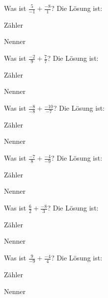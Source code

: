 \documentclass{ximera}
\begin{document}
\begin{shuffle}
\begin{question}
Was ist $\frac{5}{-1} + \frac{-8}{1}$?
Die Lösung ist:
\begin{solution}
Zähler 
\end{solution}
\begin{solution}
Nenner 
\end{solution}
\end{question}


\begin{question}
Was ist $\frac{-2}{9} + \frac{7}{7}$?
Die Lösung ist:
\begin{solution}
Zähler 
\end{solution}
\begin{solution}
Nenner 
\end{solution}
\end{question}


\begin{question}
Was ist $\frac{-8}{-8} + \frac{-10}{-7}$?
Die Lösung ist:
\begin{solution}
Zähler 
\end{solution}
\begin{solution}
Nenner 
\end{solution}
\end{question}


\begin{question}
Was ist $\frac{-7}{8} + \frac{-4}{-9}$?
Die Lösung ist:
\begin{solution}
Zähler 
\end{solution}
\begin{solution}
Nenner 
\end{solution}
\end{question}


\begin{question}
Was ist $\frac{6}{2} + \frac{-8}{3}$?
Die Lösung ist:
\begin{solution}
Zähler 
\end{solution}
\begin{solution}
Nenner 
\end{solution}
\end{question}


\begin{question}
Was ist $\frac{9}{-9} + \frac{-4}{4}$?
Die Lösung ist:
\begin{solution}
Zähler 
\end{solution}
\begin{solution}
Nenner 
\end{solution}
\end{question}



\end{shuffle}
\end{document}
